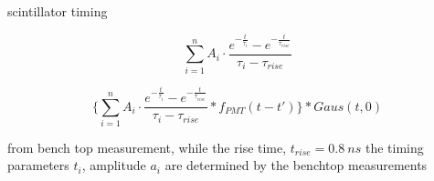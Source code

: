 scintillator timing

\[\sum^{n}_{i=1}A_i\cdot\frac{e^{-\frac{t}{\tau_i}}-e^{-\frac{t}{\tau_{rise}}}}{\tau_i-\tau_{rise}}
\]


\[
\{\sum^{n}_{i=1}A_i\cdot\frac{e^{-\frac{t}{\tau_i}}-e^{-\frac{t}{\tau_{rise}}}}{\tau_i-\tau_{rise}}*f_{PMT}(t-t')\}*Gaus(t,0)
\]






from bench top measurement, 
while the rise time, $t_{rise} = 0.8~ns$ the timing parameters $t_i$,
amplitude $a_i$ are determined by the benchtop measurements 

